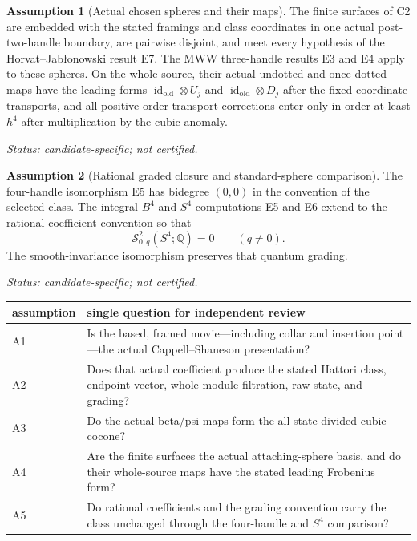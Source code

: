 \documentclass[10pt,reqno]{amsart}
\theoremstyle{definition}
\newtheorem{assumption}{Assumption}
\theoremstyle{remark}
\newcommand{\Q}{\mathbb Q}
\newcommand{\SLM}{\mathcal S}
\newcommand{\id}{\operatorname{id}}
\newcommand{\Status}[1]{\par\smallskip\noindent\textit{Status: #1.}\par\smallskip}
\newcommand{\UncertifiedStatus}{candidate-specific; not certified}
\begin{document}
\begin{assumption}[Actual chosen spheres and their maps]\label{ass:G4}
\label{ass:chosen-sphere-binding}\label{ass:hj-replacement}
\label{ass:mww-three-handle}\label{ass:sphere-map-model}
The finite surfaces of C2 are embedded with the stated framings and class
coordinates in one actual post-two-handle boundary, are pairwise disjoint,
and meet every hypothesis of the Horvat--Jab\l onowski result E7.  The MWW
three-handle results E3 and E4 apply to these spheres.  On the whole source, their
actual undotted and once-dotted maps have the leading forms
$\id_{\mathrm{old}}\otimes U_j$ and
$\id_{\mathrm{old}}\otimes D_j$ after the fixed coordinate transports, and
all positive-order transport corrections enter only in order at least $h^4$
after multiplication by the cubic anomaly.
\Status{\UncertifiedStatus}
\end{assumption}

\begin{assumption}[Rational graded closure and standard-sphere comparison]\label{ass:G5}
\label{ass:four-handle}\label{ass:s4-rational}
\label{ass:diffeo-invariance}\label{ass:four-handle-grading}
The four-handle isomorphism E5 has bidegree $(0,0)$ in the convention of the
selected class.  The integral $B^4$ and $S^4$ computations E5 and E6 extend to the
rational coefficient convention so that
\[
\SLM^2_{0,q}(S^4;\Q)=0\qquad(q\ne0).
\]
The smooth-invariance isomorphism preserves that quantum grading.
\Status{\UncertifiedStatus}
\end{assumption}

\begin{center}
\begin{tabularx}{0.96\textwidth}{@{}l>{\raggedright\arraybackslash}X@{}}
\toprule
assumption & single question for independent review\\
\midrule
A1 & Is the based, framed movie---including collar and insertion point---the
actual Cappell--Shaneson presentation?\\
A2 & Does that actual coefficient produce the stated Hattori class, endpoint
vector, whole-module filtration, raw state, and grading?\\
A3 & Do the actual beta/psi maps form the all-state divided-cubic cocone?\\
A4 & Are the finite surfaces the actual attaching-sphere basis, and do their
whole-source maps have the stated leading Frobenius form?\\
A5 & Do rational coefficients and the grading convention carry the class
unchanged through the four-handle and $S^4$ comparison?\\
\bottomrule
\end{tabularx}
\end{center}
\end{document}
